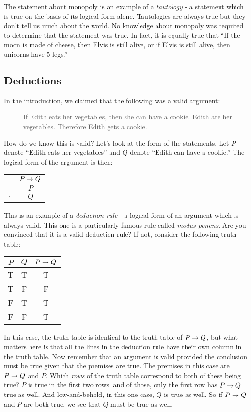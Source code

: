\documentclass[12pt]{article}
\begin{document}
The statement about monopoly is an example of a {\em tautology} - a statement which is true on the basis of its logical form alone.  Tautologies are always true but they don't tell us much about the world.  No knowledge about monopoly was required to determine that the statement was true.  In fact, it is equally true that ``If the moon is made of cheese, then Elvis is still alive, or if Elvis is still alive, then unicorns have 5 legs.''



\subsection{Deductions}

In the introduction, we claimed that the following was a valid argument:
\begin{quote}
 If Edith eats her vegetables, then she can have a cookie.  Edith ate her vegetables.  Therefore Edith gets a cookie.
\end{quote}

How do we know this is valid?  Let's look at the form of the statements.  Let $P$ denote ``Edith eats her vegetables'' and $Q$ denote ``Edith can have a cookie.''  The logical form of the argument is then:

\begin{center}
 \begin{tabular}{rc}
  & $P \rightarrow Q$ \\
  & $P$ \\ \hline
  $\therefore$ & $Q$
 \end{tabular}
\end{center}

This is an example of a {\em deduction rule} - a logical form of an argument which is always valid.  This one is a particularly famous rule called {\em modus ponens}.  Are you convinced that it is a valid deduction rule?  If not, consider the following truth table:

\begin{center}
 \begin{tabular}{c|c||c}
  $P$ & $Q$ & $P\rightarrow Q$ \\ \hline
  T & T & T \\
  T & F & F \\
  F & T & T \\
  F & F & T
 \end{tabular}
\end{center}

In this case, the truth table is identical to the truth table of $P \rightarrow Q$, but what matters here is that all the lines in the deduction rule have their own column in the truth table.  Now remember that an argument is valid provided the conclusion must be true given that the premises are true.  The premises in this case are $P \rightarrow Q$ and $P$.  Which {\em rows} of the truth table correspond to both of these being true?  $P$ is true in the first two rows, and of those, only the first row has $P \rightarrow Q$ true as well.   And low-and-behold, in this one case, $Q$ is true as well.  So if $P\rightarrow Q$ and $P$ are both true, we see that $Q$ must be true as well.
\end{document}
